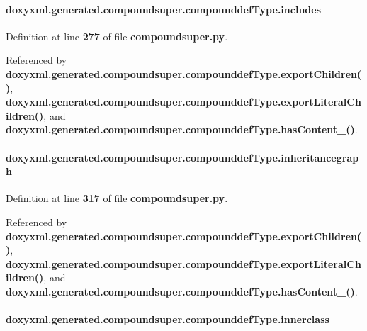 \paragraph[{includes}]{\setlength{\rightskip}{0pt plus 5cm}doxyxml.\+generated.\+compoundsuper.\+compounddef\+Type.\+includes}\label{classdoxyxml_1_1generated_1_1compoundsuper_1_1compounddefType_a2d1e68b12158c37c7c8df269b49dc1de}


Definition at line {\bf 277} of file {\bf compoundsuper.\+py}.



Referenced by {\bf doxyxml.\+generated.\+compoundsuper.\+compounddef\+Type.\+export\+Children()}, {\bf doxyxml.\+generated.\+compoundsuper.\+compounddef\+Type.\+export\+Literal\+Children()}, and {\bf doxyxml.\+generated.\+compoundsuper.\+compounddef\+Type.\+has\+Content\+\_\+()}.

\paragraph[{inheritancegraph}]{\setlength{\rightskip}{0pt plus 5cm}doxyxml.\+generated.\+compoundsuper.\+compounddef\+Type.\+inheritancegraph}\label{classdoxyxml_1_1generated_1_1compoundsuper_1_1compounddefType_a28ffd8af5739908cf0127d07b185c2e0}


Definition at line {\bf 317} of file {\bf compoundsuper.\+py}.



Referenced by {\bf doxyxml.\+generated.\+compoundsuper.\+compounddef\+Type.\+export\+Children()}, {\bf doxyxml.\+generated.\+compoundsuper.\+compounddef\+Type.\+export\+Literal\+Children()}, and {\bf doxyxml.\+generated.\+compoundsuper.\+compounddef\+Type.\+has\+Content\+\_\+()}.

\paragraph[{innerclass}]{\setlength{\rightskip}{0pt plus 5cm}doxyxml.\+generated.\+compoundsuper.\+compounddef\+Type.\+innerclass}\label{classdoxyxml_1_1generated_1_1compoundsuper_1_1compounddefType_abe881362fd0e43a3fb125f5410b0094a}


